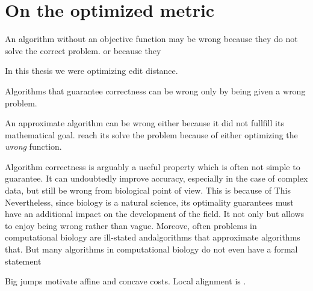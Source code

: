 \section{On the optimized metric}

An algorithm without an objective function may be wrong because they do not
solve the correct problem. or because they 

In this thesis we were optimizing edit distance. 

Algorithms that guarantee correctness can be wrong only by being given a wrong problem.

An approximate algorithm can be wrong either because it did not fullfill its
mathematical goal. reach its solve the problem because of either optimizing the
\emph{wrong} function.

Algorithm correctness is arguably a useful property which is often not simple to
guarantee. It can undoubtedly improve accuracy, especially in the case of
complex data, but still be wrong from biological point of view. This is because
of  This Nevertheless, since biology is a natural science, its  optimality
guarantees must have an additional impact on the development of the field. It
not only but allows to enjoy being wrong rather than vague. Moreove, often
problems in computational biology are ill-stated andalgorithms that approximate
algorithms that. But many algorithms in computational biology do not even have a
formal statement 

Big jumps motivate affine and concave costs. Local alignment is
\cite{arslan2001new}.